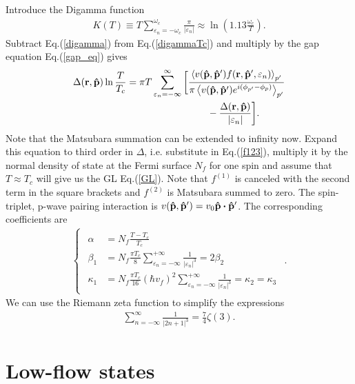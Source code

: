\documentclass[aps,prb,reprint,groupedaddress]{revtex4-2}
\begin{document}
Introduce the Digamma function
\begin{align}\label{digamma}
    K(T)\equiv T\sum_{\varepsilon_n=-\omega_c}^{\omega_c}\frac{\pi}{|\varepsilon_n|}\approx\ln{\left(1.13\frac{\omega_c}{T}\right)}.
\end{align}
Subtract Eq.(\ref{digamma}) from Eq.(\ref{digammaTc}) and multiply by the gap equation Eq.(\ref{gap_eq}) gives
\begin{align}
    \Delta(\vb{r},\vu{p})\ln{\frac{T}{T_c}}=\pi T\sum_{\varepsilon_n=-\infty}^{\infty}\bigg[ & \frac{\ev{v(\vu{p},\vu{p}')f(\vb{r},\vu{p}',\varepsilon_n)}_{p'}}{\pi\ev{v(\vu{p},\vu{p}')e^{i(\phi_{p'}-\phi_p)}}_{p'}}\nonumber \\
                                                                                             & \qq{}-\frac{\Delta(\vb{r},\vu{p})}{|\varepsilon_n|}\bigg].
\end{align}
Note that the Matsubara summation can be extended to infinity now. Expand this equation to third order in $\Delta$, i.e. substitute in Eq.(\ref{f123}), multiply it by the normal density of state at the Fermi surface $N_f$ for one spin and assume that $T\approx T_c$ will give us the GL Eq.(\ref{GL}). Note that $f^{(1)}$ is canceled with the second term in the square brackets and $f^{(2)}$ is Matsubara summed to zero. The spin-triplet, p-wave pairing interaction is $v(\vu{p},\vu{p}')=v_0\vu{p}\vdot\vu{p}'$. The corresponding coefficients are
\begin{align}
    \begin{cases}
        \begin{aligned}
            \alpha   & =N_f\frac{T-T_c}{T_c}                                                                                                  \\
            \beta_1  & =N_f\frac{\pi T_c}{8}\sum_{\varepsilon_n=-\infty}^{+\infty}\frac{1}{|\varepsilon_n|^3}=2\beta_2                        \\
            \kappa_1 & =N_f\frac{\pi T_c}{16}(\hbar v_f)^2\sum_{\varepsilon_n=-\infty}^{+\infty}\frac{1}{|\varepsilon_n|^3}=\kappa_2=\kappa_3
        \end{aligned}
    \end{cases}.
\end{align}
We can use the Riemann zeta function to simplify the expressions
\begin{align}
    \sum_{n=-\infty}^\infty\frac{1}{|2n+1|^3}=\frac{7}{4}\zeta(3).
\end{align}

\section{Low-flow states}\label{appendix2}


\end{document}
